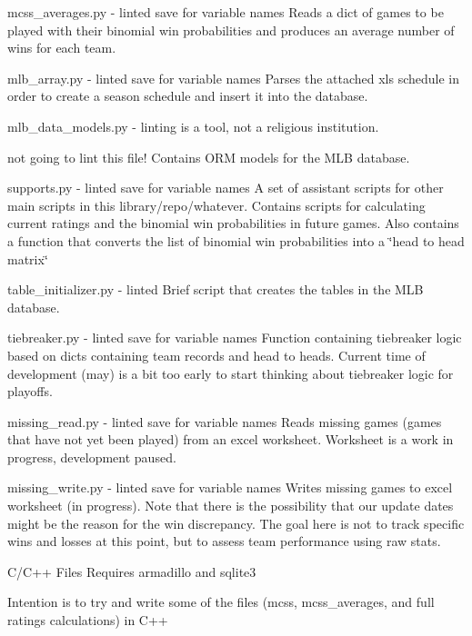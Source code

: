 \begin{DoxyEnumerate}
\item mcss\+\_\+averages.\+py -\/ linted save for variable names Reads a dict of games to be played with their binomial win probabilities and produces an average number of wins for each team.
\item mlb\+\_\+array.\+py -\/ linted save for variable names Parses the attached xls schedule in order to create a season schedule and insert it into the database.
\item mlb\+\_\+data\+\_\+models.\+py -\/ linting is a tool, not a religious institution.
\begin{DoxyItemize}
\item not going to lint this file! Contains O\+RM models for the M\+LB database.
\end{DoxyItemize}
\item supports.\+py -\/ linted save for variable names A set of assistant scripts for other main scripts in this library/repo/whatever. Contains scripts for calculating current ratings and the binomial win probabilities in future games. Also contains a function that converts the list of binomial win probabilities into a \char`\"{}head to head matrix\char`\"{}
\item table\+\_\+initializer.\+py -\/ linted Brief script that creates the tables in the M\+LB database.
\item tiebreaker.\+py -\/ linted save for variable names Function containing tiebreaker logic based on dicts containing team records and head to heads. Current time of development (may) is a bit too early to start thinking about tiebreaker logic for playoffs.
\item missing\+\_\+read.\+py -\/ linted save for variable names Reads missing games (games that have not yet been played) from an excel worksheet. Worksheet is a work in progress, development paused.
\item missing\+\_\+write.\+py -\/ linted save for variable names Writes missing games to excel worksheet (in progress). Note that there is the possibility that our update dates might be the reason for the win discrepancy. The goal here is not to track specific wins and losses at this point, but to assess team performance using raw stats.
\end{DoxyEnumerate}

C/\+C++ Files Requires armadillo and sqlite3

Intention is to try and write some of the files (mcss, mcss\+\_\+averages, and full ratings calculations) in C++


